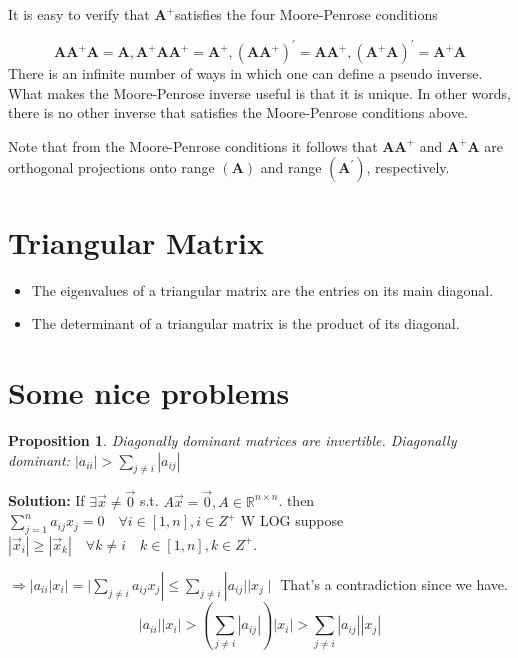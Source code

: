 \documentclass[14pt]{article}
\newtheorem{proposition}[theorem]{Proposition}
\theoremstyle{definition}
\newenvironment{solution}
{\color{C2}\begin{framed}\begingroup\textbf{Solution:} }
  {\endgroup\end{framed}}
\theoremstyle{remark}
\newenvironment{remark}
  {\pushQED{\qed}\renewcommand{\qedsymbol}{$\triangle$}\remarkx}
  {\popQED\endremarkx}
\begin{document}
\begin{multicols*}{2}
    It is easy to verify that $\mathbf{A}^{+}$satisfies the four Moore-Penrose conditions

    $$
    \mathbf{A} \mathbf{A}^{+} \mathbf{A} =\mathbf{A}, \mathbf{A}^{+} \mathbf{A} \mathbf{A}^{+} =\mathbf{A}^{+},
    \left(\mathbf{A A}^{+}\right)^{\prime}  =\mathbf{A A}^{+}, \left(\mathbf{A}^{+} \mathbf{A}\right)^{\prime} =\mathbf{A}^{+} \mathbf{A}
    $$
    \begin{remark}
        There is an infinite number of ways in which one can define a pseudo inverse. 
        What makes the Moore-Penrose inverse useful is that it is {\color{blue}unique}. 
        In other words, there is no other inverse that satisfies the Moore-Penrose conditions above.

    Note that from the Moore-Penrose conditions it follows that $\mathbf{A A}^{+}$ and $\mathbf{A}^{+} \mathbf{A}$ are orthogonal projections onto range $(\mathbf{A})$ and range $\left(\mathbf{A}^{\prime}\right)$, respectively.

    \end{remark}
    \end{multicols*}


\headrule

\section{Triangular Matrix}
\begin{itemize}
    \item The eigenvalues of a triangular matrix are the entries on its main diagonal.
    \item The determinant of a triangular matrix is the product of its diagonal.
\end{itemize}

\headrule

\section{Some nice problems}
\begin{proposition}
    Diagonally dominant matrices are invertible.
    Diagonally dominant: $\left|a_{i i}\right|>\sum_{j \neq i}\left|a_{i j}\right|$
\end{proposition}
\begin{solution}
    If $\exists \vec{x} \neq \overrightarrow{0}$ s.t. $A \vec{x}=\overrightarrow{0}, A \in \mathbb{R}^{n \times n}$.
    then $\sum_{j=1}^n a_{i j} x_j=0 \quad \forall i \in[1, n], i \in Z^{+}$
    W LOG suppose $\left|\vec{x}_i\right| \ge\left|\vec{x}_k\right| \quad \forall k \neq i \quad k \in[1, n], k \in Z^{+}$.

    $\Rightarrow\left|a_{i i}\right| x_i|=| \sum_{j \neq i} a_{i j} x_j\left|\leqslant \sum_{j \neq i}\right| a_{i j}|| x_j \mid$
    That's a contradiction since we have.
    $$
        \left|a_{ii}\right|\left|x_i\right|>\left(\sum_{j\ne i}\left|a_{i j}\right|\right)\left|x_i\right|>\sum_{j \neq i}\left|a_{i j}\right|\left|x_j\right|
    $$
\end{solution}
\end{document}
